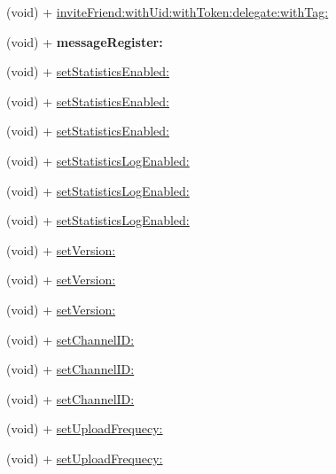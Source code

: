 \begin{DoxyCompactItemize}
\item 
(void) + \mbox{\hyperlink{interface_weibo_s_d_k_a12e37cf863202654e615232885fa596f}{invite\+Friend\+:with\+Uid\+:with\+Token\+:delegate\+:with\+Tag\+:}}
\item 
\mbox{\label{interface_weibo_s_d_k_afd33ff21d39c13140c2c2d3f69d368ce}} 
(void) + {\bfseries message\+Register\+:}
\item 
(void) + \mbox{\hyperlink{interface_weibo_s_d_k_a0b32ee3e2b30059b93e7dea204b43818}{set\+Statistics\+Enabled\+:}}
\item 
(void) + \mbox{\hyperlink{interface_weibo_s_d_k_a0b32ee3e2b30059b93e7dea204b43818}{set\+Statistics\+Enabled\+:}}
\item 
(void) + \mbox{\hyperlink{interface_weibo_s_d_k_a0b32ee3e2b30059b93e7dea204b43818}{set\+Statistics\+Enabled\+:}}
\item 
(void) + \mbox{\hyperlink{interface_weibo_s_d_k_a2e009db32a6d059ff53e35ac211d57f9}{set\+Statistics\+Log\+Enabled\+:}}
\item 
(void) + \mbox{\hyperlink{interface_weibo_s_d_k_a2e009db32a6d059ff53e35ac211d57f9}{set\+Statistics\+Log\+Enabled\+:}}
\item 
(void) + \mbox{\hyperlink{interface_weibo_s_d_k_a2e009db32a6d059ff53e35ac211d57f9}{set\+Statistics\+Log\+Enabled\+:}}
\item 
(void) + \mbox{\hyperlink{interface_weibo_s_d_k_ac68e6c65a10fa6c5f04c1293050a7127}{set\+Version\+:}}
\item 
(void) + \mbox{\hyperlink{interface_weibo_s_d_k_ac68e6c65a10fa6c5f04c1293050a7127}{set\+Version\+:}}
\item 
(void) + \mbox{\hyperlink{interface_weibo_s_d_k_ac68e6c65a10fa6c5f04c1293050a7127}{set\+Version\+:}}
\item 
(void) + \mbox{\hyperlink{interface_weibo_s_d_k_a8d9fad53942642ec304ecba4734e05c1}{set\+Channel\+I\+D\+:}}
\item 
(void) + \mbox{\hyperlink{interface_weibo_s_d_k_a8d9fad53942642ec304ecba4734e05c1}{set\+Channel\+I\+D\+:}}
\item 
(void) + \mbox{\hyperlink{interface_weibo_s_d_k_a8d9fad53942642ec304ecba4734e05c1}{set\+Channel\+I\+D\+:}}
\item 
(void) + \mbox{\hyperlink{interface_weibo_s_d_k_a6790cf45454697f2b846eb080a130ef2}{set\+Upload\+Frequecy\+:}}
\item 
(void) + \mbox{\hyperlink{interface_weibo_s_d_k_a6790cf45454697f2b846eb080a130ef2}{set\+Upload\+Frequecy\+:}}

\end{DoxyCompactItemize}
